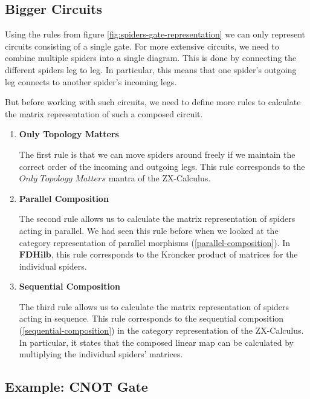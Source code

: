 \subsection{Bigger Circuits}

Using the rules from figure \ref{fig:spiders-gate-representation} we can only represent circuits consisting of a single gate. For more extensive circuits, we need to combine multiple spiders into a single diagram. This is done by connecting the different spiders leg to leg. In particular, this means that one spider's outgoing leg connects to another spider's incoming legs.

But before working with such circuits, we need to define more rules to calculate the matrix representation of such a composed circuit.

\begin{enumerate}

    \item \textbf{Only Topology Matters}

          The first rule is that we can move spiders around freely if we maintain the correct order of the incoming and outgoing legs. This rule corresponds to the $\textit{Only Topology Matters}$ mantra of the ZX-Calculus.

    \item \textbf{Parallel Composition}

          The second rule allows us to calculate the matrix representation of spiders acting in parallel. We had seen this rule before when we looked at the category representation of parallel morphisms (\ref{parallel-composition}). In $\mathbf{FDHilb}$, this rule corresponds to the Kroncker product of matrices for the individual spiders.

    \item \textbf{Sequential Composition}

          The third rule allows us to calculate the matrix representation of spiders acting in sequence. This rule corresponds to the sequential composition (\ref{sequential-composition}) in the category representation of the ZX-Calculus. In particular, it states that the composed linear map can be calculated by multiplying the individual spiders' matrices.
\end{enumerate}

\subsection{Example: CNOT Gate}

